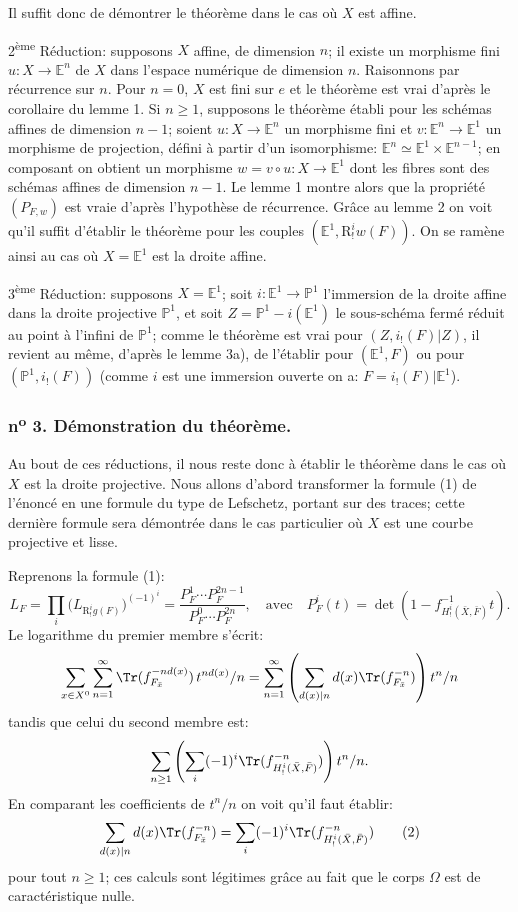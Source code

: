 Il suffit donc de démontrer le théorème dans le cas où $X$ est affine.

2\textsuperscript{ème} Réduction: supposons $X$ affine, de dimension $n$; il existe un morphisme fini $u:X\to\mathbb{E}^n$ de $X$ dans l'espace numérique de dimension $n$. Raisonnons par récurrence sur $n$. Pour $n=0$, $X$ est fini sur $e$ et le théorème est vrai d'après le corollaire du lemme 1. Si $n\ge1$, supposons le théorème établi pour les schémas affines de dimension $n-1$; soient $u:X\to\mathbb{E}^n$ un morphisme fini et $v:\mathbb{E}^n\to\mathbb{E}^1$ un morphisme de projection, défini à partir d'un isomorphisme: $\mathbb{E}^n\simeq\mathbb{E}^1\times\mathbb{E}^{n-1}$; en composant on obtient un morphisme $w=v\circ u:X\to\mathbb{E}^1$ dont les fibres sont des schémas affines de dimension $n-1$. Le lemme 1 montre alors que la propriété $(P_{F,w})$ est vraie d'après l'hypothèse de récurrence. Grâce au lemme 2 on voit qu'il suffit d'établir le théorème pour les couples 
$(\mathbb{E}^1,\mathrm{R}^i_!w(F))$. On se ramène
ainsi au cas où $X=\mathbb{E}^1$ est la droite affine.

3\textsuperscript{ème} Réduction: supposons $X=\mathbb{E}^1$; soit $i:\mathbb{E}^1\to\mathbb{P}^1$ l'immersion de la droite affine dans la droite projective $\mathbb{P}^1$, et soit $Z=\mathbb{P}^1-i(\mathbb{E}^1)$ le sous-schéma fermé réduit au point à l'infini de $\mathbb{P}^1$; comme le théorème est vrai pour $(Z,i_!(F)|Z)$, il revient au même, d'après le lemme 3a), de l'établir pour $(\mathbb{E}^1,F)$ ou pour $(\mathbb{P}^1,i_!(F))$ (comme $i$ est une immersion ouverte on a: $F=i_!(F)|\mathbb{E}^1$).

\subsubsection*{n\textsuperscript{o} 3. Démonstration du théorème.}

Au bout de ces réductions, il nous reste donc à établir le théorème dans le cas où $X$ est la droite projective. Nous allons d'abord transformer la formule (1) de l'énoncé en une formule du type de Lefschetz, portant sur des traces; cette dernière formule sera démontrée dans le cas particulier où $X$ est une courbe projective et lisse.

Reprenons la formule (1):
\[
L_F=\prod_i\bigl(L_{\mathrm{R}^i_!g(F)}\bigr)^{(-1)^i}
=\frac{P_F^1\cdots P_F^{2n-1}}{P_F^0\cdots P_F^{2n}},
\quad\text{avec}\quad
P_F^i(t)=\det(1-f^{-1}_{H^i_!(\bar X,\bar F)}t).
\]
Le logarithme du premier membre s'écrit:
\[
\sum_{x\in X^0}\sum_{n=1}^{\infty}\Tr(f_{F_{\bar x}}^{-n d(x)})\,t^{n d(x)}/n
=\sum_{n=1}^{\infty}\left(\sum_{d(x)|n} d(x)\Tr(f_{F_{\bar x}}^{-n})\right)t^n/n
\]
tandis que celui du second
membre est:
\[
\sum_{n\ge1}\left(\sum_i(-1)^i\Tr(f^{-n}_{H^i_!(\bar X,\bar F)})\right)t^n/n.
\]
En comparant les coefficients de $t^n/n$ on voit qu'il faut établir:
\[
\sum_{d(x)|n}d(x)\Tr(f_{F_{\bar x}}^{-n})
=\sum_i(-1)^i\Tr(f^{-n}_{H^i_!(\bar X,\bar F)})
\tag{2}
\]
pour tout $n\ge1$; ces calculs sont légitimes grâce au fait que le corps $\Omega$ est de caractéristique nulle.

